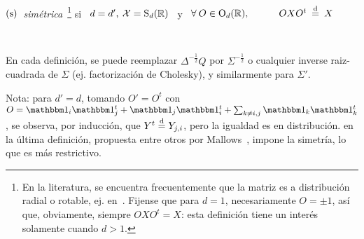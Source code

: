 \begin{definicion}
\

\centerline{$(\mathrm{s})  \:$  {\em  sim\'etrica}~\footnote{En  la  literatura,  se
    encuentra frecuentemente que la matriz es a distribuci\'on radial o rotable,
    ej. en~\cite{Tyl82, BilBre99}. Fijense que para $d = 1$, necesariamente $O =
    \pm 1$,  as\'i que,  obviamente, siempre  $O X O^t  = X$:  esta definici\'on
    tiene  un inter\'es  solamente cuando  $d  > 1$.}  si \  $d  = d',  \: \mathcal{X}  =
  \mathrm{S}_d(\mathbb{R})$ \ y  \ $\forall \: O \in \mathrm{O}_d(\mathbb{R}), \quad\qquad  O X O^t \:
  \stackrel{\mathrm{d}}{=} \: X$}

\

En   cada  definici\'on,   se   puede  reemplazar   $\Delta^{-\frac12}  Q$   por
$\Sigma^{-\frac12}$    o   cualquier    inverse   raiz-cuadrada    de   $\Sigma$
(ej. factorizaci\'on de Cholesky), y similarmente para $\Sigma'$.
\end{definicion}

Nota: para $d' = d$, tomando $O' =  O^t$ con $O = \un_i \un_j^t + \un_j \un_i^t
+ \sum_{k \ne i,j} \un_k \un_k^t$,  se observa, por inducci\'on, que $Y^t \stackrel{\mathrm{d}}{=}
Y_{j,i}$, pero  la igualdad es  en distribuci\'on. en la  \'ultima definici\'on,
propuesta entre otros por Mallows~\cite{Mal61},  impone la simetr\'ia, lo que es
m\'as restrictivo.

